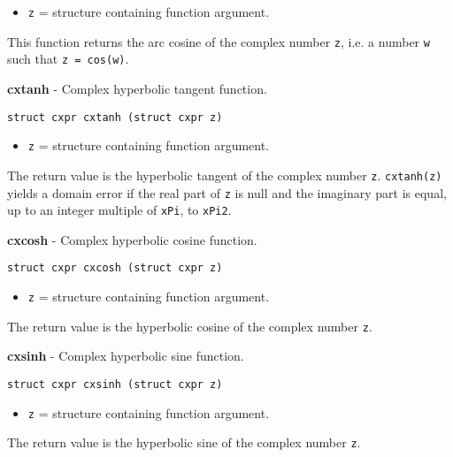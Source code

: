 \documentclass{article}
\begin{document}
\begin{itemize}
\item \texttt{z} = structure containing function argument.
\end{itemize}

This function returns the arc cosine of the complex 
number \texttt{z}, i.e. a number \texttt{w} such that
\texttt{z = cos(w)}.


\hrulefill{}

\textbf{cxtanh} - Complex hyperbolic tangent function.

\begin{verbatim}
struct cxpr cxtanh (struct cxpr z)
\end{verbatim}

\begin{itemize}
\item \texttt{z} = structure containing function argument.
\end{itemize}

The return value is the hyperbolic tangent
of the complex number \texttt{z}.
\texttt{cxtanh(z)} yields a domain error if the real
part of \texttt{z} is null and the imaginary part is equal,
up to an integer multiple of \texttt{xPi}, to \texttt{xPi2}.


\hrulefill{}

\textbf{cxcosh} - Complex hyperbolic cosine function.

\begin{verbatim}
struct cxpr cxcosh (struct cxpr z)
\end{verbatim}

\begin{itemize}
\item \texttt{z} = structure containing function argument.
\end{itemize}

The return value is the hyperbolic cosine of 
the complex number \texttt{z}.


\hrulefill{}

\textbf{cxsinh} - Complex hyperbolic sine function.

\begin{verbatim}
struct cxpr cxsinh (struct cxpr z)
\end{verbatim}

\begin{itemize}
\item \texttt{z} = structure containing function argument.
\end{itemize}

The return value is the hyperbolic sine of 
the complex number \texttt{z}.
\end{document}
